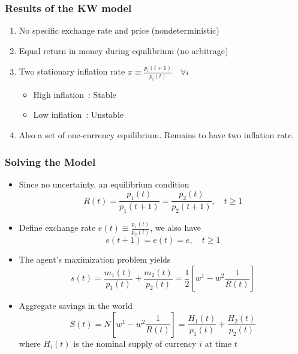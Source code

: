 \begin{frame}
    \frametitle{Results of the KW model}
    \begin{enumerate}
        \item No specific exchange rate and price (nondeterministic)
        \item Equal return in money during equilibrium (no arbitrage)
        \item Two stationary inflation rate $\pi \equiv \frac{p_i(t+1)}{p_i(t)} \quad \forall i$
        \begin{itemize}
            \item High inflation~: Stable
            \item Low inflation~: Unstable
        \end{itemize}
        \item Also a set of one-currency equilibrium. Remains to have two inflation rate.
    \end{enumerate}

\end{frame}

\begin{frame}[allowframebreaks]
    \frametitle{Solving the Model}
    \begin{itemize}
        \item Since no uncertainty, an equilibrium condition 
        \begin{equation*}
            R(t) = \frac{p_1(t)}{p_1(t+1)} =  \frac{p_2(t)}{p_2(t+1)}, \quad t \ge 1
        \end{equation*}

        \item Define exchange rate $e(t) \equiv \frac{p_1(t)}{p_2(t)}$, we also have 
        \begin{equation*}
            e(t+1) = e(t) = e , \quad t\ge 1
        \end{equation*}

        \item The agent's maximization problem yields 
        \begin{equation*}
            s(t) = \frac{m_1(t)}{p_1(t)} + \frac{m_2(t)}{p_2(t)} 
            = \frac{1}{2} \left[w^1 - w^2 \frac{1}{R(t)}\right]
        \end{equation*}

        \item Aggregate savings in the world
        \begin{equation*}
            S(t) = N \left[w^1 - w^2 \frac{1}{R(t)}\right] 
            = \frac{H_1(t)}{p_1(t)} + \frac{H_2(t)}{p_2(t)} 
        \end{equation*}
        where $H_i(t)$ is the nominal supply of currency $i$ at time $t$
    \end{itemize}

\end{frame}

